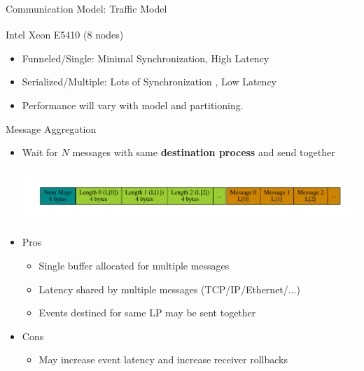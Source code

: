 \documentclass[10pt]{beamer}
\begin{document}
\begin{frame}{Communication Model: Traffic Model}
\begin{block}{Intel\textsuperscript{\textregistered} Xeon\textsuperscript{\textregistered}
        E5410 (8 nodes)}
\begin{minipage}{0.55\textwidth}
        \end{minipage}
      \begin{footnotesize}
        \begin{itemize}
            \item Funneled/Single: Minimal Synchronization, High Latency
            \item Serialized/Multiple: Lots of Synchronization , Low Latency
            \item Performance will vary with model and partitioning.
        \end{itemize}
      \end{footnotesize}
    \end{block}
\end{frame}

\begin{frame}{Message Aggregation}
    \begin{itemize}
        \item Wait for $N$ messages with same \textbf{destination process} and send together

        \centerline{\includegraphics[width=1.25\textwidth]{../figs/graphviz/aggregation_format.pdf}}

        \item Pros
            \begin{itemize}
                \item Single buffer allocated for multiple messages
                \item Latency shared by multiple messages (TCP/IP/Ethernet/...)
                \item Events destined for same LP may be sent together
            \end{itemize}
            \bigskip
        \item Cons
            \begin{itemize}
                \item May increase event latency and increase receiver rollbacks
            \end{itemize}
    \end{itemize}
\end{frame}
\end{document}
